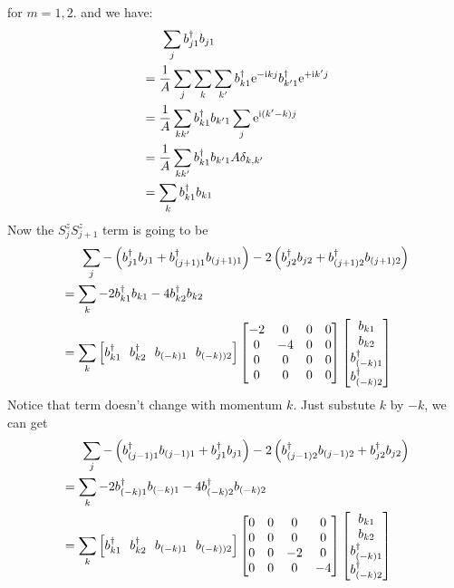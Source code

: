 \documentclass[letterpaper,10pt]{article}
\newcommand{\e}{\mathrm{e}}
\newcommand{\ii}{\mathrm{i}}
\begin{document}
for $m=1,2$. and we have:
$$\begin{aligned}
&\indent \sum_j b_{j1}^{\dagger}b_{j1} \\
&=\frac{1}{A}\sum_{j}\sum_{k}\sum_{k'}b_{k1}^{\dagger}\e^{-\ii kj}b_{k'1}^{\dagger}\e^{+\ii k'j}\\
&=\frac{1}{A}\sum_{kk'}b_{k1}^{\dagger}b_{k'1}\sum_{j}\e^{\ii(k'-k)j}\\
&=\frac{1}{A}\sum_{kk'}b_{k1}^{\dagger}b_{k'1} A \delta_{k,k'}\\
&=\sum_{k}b_{k1}^{\dagger}b_{k1}
\end{aligned}
$$
Now the $S_j^z S_{j+1}^z$ term is going to be$$\begin{aligned}
& \indent \sum_j -\left(b_{j1}^{\dagger}b_{j1}+b_{(j+1)1}^{\dagger}b_{(j+1)1}\right)-2\left(b_{j2}^{\dagger}b_{j2}+b_{(j+1)2}^{\dagger}b_{(j+1)2}\right)\\
&= \sum_{k}-2b_{k1}^{\dagger}b_{k1}-4b_{k2}^{\dagger}b_{k2}\\
&=\sum_k \left[
    b_{k1}^{\dagger} \ \ 
    b_{k2}^{\dagger}\  \ 
    b_{(-k)1}\ \ 
    b_{(-k))2}\right]
   \begin{bmatrix}
        -2 & 0 & 0 & 0 \\
       0 &  -4 & 0 &0 \\
       0 &  0 & 0 &0\\
        0 & 0 & 0& 0
        \end{bmatrix}\begin{bmatrix}
            b_{k1}  \\
            b_{k2}  \\
            b_{(-k)1}^{\dagger}\\
            b_{(-k)2}^{\dagger}
            \end{bmatrix}
\end{aligned}
$$
Notice that term doesn't change with momentum $k$. Just substute $k$ by $-k$, we can get $$\begin{aligned}
    & \indent \sum_j -\left(b_{(j-1)1}^{\dagger}b_{(j-1)1}+b_{j1}^{\dagger}b_{j1}\right)-2\left(b_{(j-1)2}^{\dagger}b_{(j-1)2}+b_{j2}^{\dagger}b_{j2}\right)\\
    &= \sum_{k}-2b_{(-k)1}^{\dagger}b_{(-k)1}-4b_{(-k)2}^{\dagger}b_{(-k)2}\\
    &=\sum_k \left[
        b_{k1}^{\dagger} \ \ 
        b_{k2}^{\dagger}\  \ 
        b_{(-k)1}\ \ 
        b_{(-k))2}\right]
       \begin{bmatrix}
            0 & 0 & 0 & 0 \\
           0 &  0 & 0 &0 \\
           0 &  0 & -2 &0\\
            0 & 0 & 0& -4
            \end{bmatrix}\begin{bmatrix}
                b_{k1}  \\
                b_{k2}  \\
                b_{(-k)1}^{\dagger}\\
                b_{(-k)2}^{\dagger}
                \end{bmatrix}
    \end{aligned}
    $$\\
\end{document}
